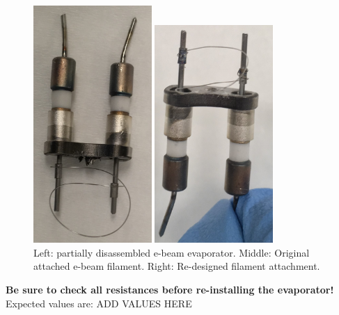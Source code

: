 \begin{figure}[H]
\begin{minipage}[b]{0.33\linewidth}
	\centering
	\includegraphics[width=0.4\textwidth]{filament.jpg}  %
\end{minipage}\hfill
\begin{minipage}[b]{0.33\linewidth}
	\centering
	\includegraphics[width=0.4\textwidth]{filament_new_design.jpg}  %
\end{minipage}\hfill
	\caption{Left: partially disassembled e-beam evaporator. Middle: Original attached e-beam filament. Right: Re-designed filament attachment.}
	\label{fig:filament}
\end{figure}

\textbf{Be sure to check all resistances before re-installing the evaporator!} Expected values are:
ADD VALUES HERE

